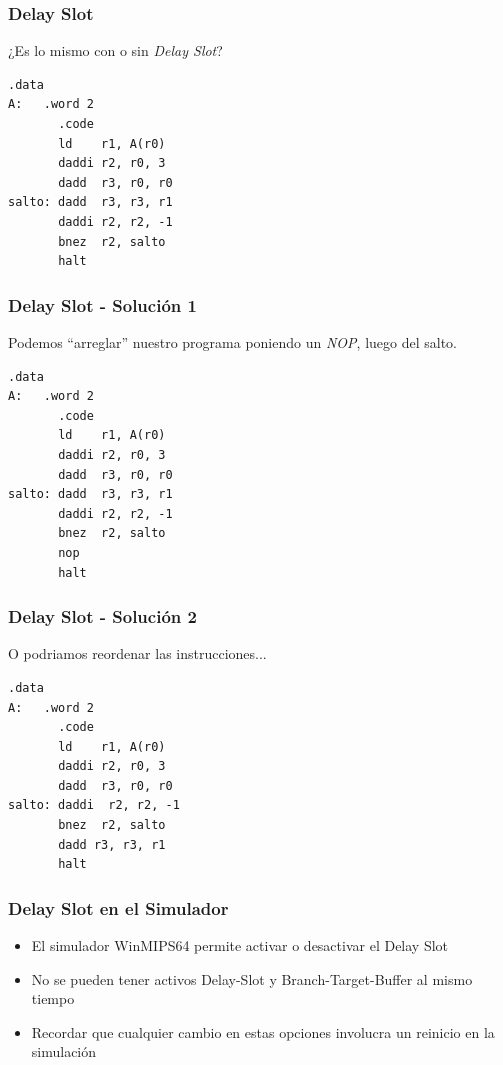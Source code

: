 \documentclass{beamer}
\begin{document}
\begin{frame}[fragile]
\frametitle{Delay Slot}
¿Es lo mismo con o sin \emph{Delay Slot}?
\begin{block}{}
\begin{lstlisting}[basicstyle=\ttfamily,keywordstyle=\color{blue}]
       .data
A:   .word 2
       .code
       ld    r1, A(r0)
       daddi r2, r0, 3
       dadd  r3, r0, r0
salto: dadd  r3, r3, r1
       daddi r2, r2, -1
       bnez  r2, salto
       halt
\end{lstlisting}
\end{block}
\end{frame}


\begin{frame}[fragile]
\frametitle{Delay Slot - Solución 1 }
Podemos ``arreglar'' nuestro programa poniendo un \emph{NOP}, luego del salto.
\begin{block}{}
\begin{lstlisting}[basicstyle=\ttfamily,keywordstyle=\color{blue}]
       .data
A:   .word 2
       .code
       ld    r1, A(r0)
       daddi r2, r0, 3
       dadd  r3, r0, r0
salto: dadd  r3, r3, r1
       daddi r2, r2, -1
       bnez  r2, salto
       nop
       halt
\end{lstlisting}
\end{block}
\end{frame}


\begin{frame}[fragile]
\frametitle{Delay Slot - Solución 2 }
O podriamos reordenar las instrucciones...
\begin{block}{}
\begin{lstlisting}[basicstyle=\ttfamily,keywordstyle=\color{blue}]
       .data
A:   .word 2
       .code
       ld    r1, A(r0)
       daddi r2, r0, 3
       dadd  r3, r0, r0
salto: daddi  r2, r2, -1
       bnez  r2, salto
       dadd r3, r3, r1
       halt
\end{lstlisting}
\end{block}
\end{frame}


\begin{frame}
\frametitle{Delay Slot en el Simulador}
\begin{itemize}
\item El simulador WinMIPS64 permite activar o desactivar el Delay Slot
\item No se pueden tener activos Delay-Slot y Branch-Target-Buffer al mismo tiempo
\item Recordar que cualquier cambio en estas opciones involucra un reinicio en la simulación
\end{itemize}
\end{frame}
\end{document}
